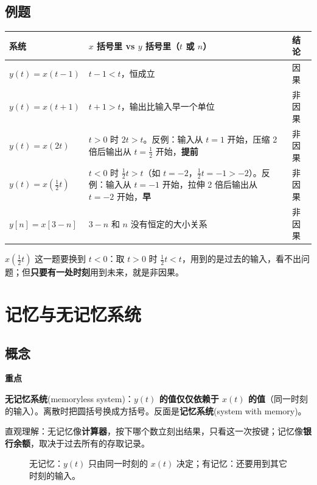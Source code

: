 \documentclass[UTF8,a4paper,11pt]{ctexart}
\newenvironment{remember}{\begin{rememberbox}\textbf{重点}\par\smallskip}{\end{rememberbox}}
\newcounter{ex}[section]
\newcommand{\sysline}[4]{%
  \node[anchor=east] at (2.9,#1) {#2};
  \draw[->,thick] (3.0,#1) -- (3.8,#1);
  \node[draw,rounded corners=2pt,fill=blue!6,minimum width=1.3cm,minimum height=0.62cm] at (4.45,#1) {\small 系统};
  \draw[->,thick] (5.1,#1) -- (5.9,#1);
  \node[anchor=west] at (6.0,#1) {#3};
  \node[anchor=west,gray!55!black,font=\footnotesize] at (9.4,#1) {#4};}
\begin{document}
\subsection{例题}
\begin{center}
\begin{tabular}{@{}lp{6.6cm}l@{}}
\toprule
系统 & $x$ 括号里 vs $y$ 括号里（$t$ 或 $n$） & 结论\\
\midrule
$y(t)=x(t-1)$ & $t-1<t$，恒成立 & 因果\\
$y(t)=x(t+1)$ & $t+1>t$，输出比输入早一个单位 & 非因果\\
$y(t)=x(2t)$ & $t>0$ 时 $2t>t$。反例：输入从 $t=1$ 开始，压缩 2 倍后输出从 $t=\tfrac12$ 开始，\textbf{提前} & 非因果\\
$y(t)=x(\tfrac12 t)$ & $t<0$ 时 $\tfrac12t>t$（如 $t=-2$，$\tfrac12t=-1>-2$）。反例：输入从 $t=-1$ 开始，拉伸 2 倍后输出从 $t=-2$ 开始，\textbf{早} & 非因果\\
$y[n]=x[3-n]$ & $3-n$ 和 $n$ 没有恒定的大小关系 & 非因果\\
\bottomrule
\end{tabular}
\end{center}
$x(\tfrac12t)$ 这一题要换到 $t<0$：取 $t>0$ 时 $\tfrac12t<t$，用到的是过去的输入，看不出问题；但\textbf{只要有一处时刻}用到未来，就是非因果。

\section{记忆与无记忆系统}
\subsection{概念}
\begin{remember}
\textbf{无记忆系统}(memoryless system)：\textbf{$y(t)$ 的值仅仅依赖于 $x(t)$ 的值}（同一时刻的输入）。离散时把圆括号换成方括号。反面是\textbf{记忆系统}(system with memory)。
\end{remember}
直观理解：无记忆像\textbf{计算器}，按下哪个数立刻出结果，只看这一次按键；记忆像\textbf{银行余额}，取决于过去所有的存取记录。

\begin{figure}[H]
\centering
{}
\caption{无记忆：$y(t)$ 只由同一时刻的 $x(t)$ 决定；有记忆：还要用到其它时刻的输入。}
\end{figure}
\end{document}
